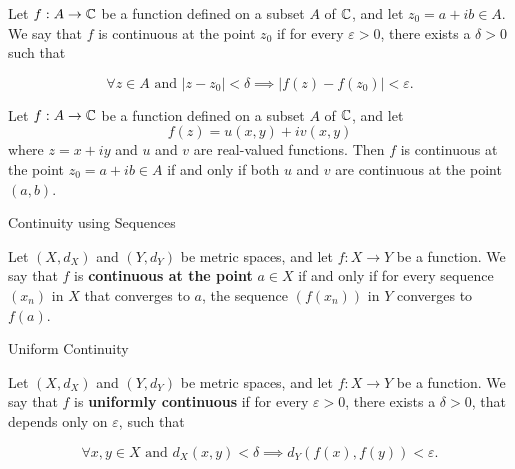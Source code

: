 \documentclass[12pt, a4paper]{article}
\begin{document}
\vspace{10pt}

\begin{definition}
    Let $f : A \to \mathbb{C}$ be a function defined on a subset $A$ of $\mathbb{C}$, and let $z_0 = a + ib \in A$. We say that $f$ is continuous at the point $z_0$ if for every $\varepsilon > 0$, there exists a $\delta > 0$ such that
    
    \[\forall z \in A \text{ and } |z - z_0| < \delta \implies |f(z) - f(z_0)| < \varepsilon.\]
\end{definition}

\vspace{50pt}

\begin{definition}
    Let $f : A \to \mathbb{C}$ be a function defined on a subset $A$ of $\mathbb{C}$, and let $$f(z) = u(x, y) + iv(x, y)$$ where $z = x + iy$ and $u$ and $v$ are real-valued functions. Then $f$ is continuous at the point $z_0 = a + ib \in A$ if and only if both $u$ and $v$ are continuous at the point $(a, b)$.
    
\end{definition}

\clearpage

\begin{heading}
    Continuity using Sequences
\end{heading}

\vspace{10pt}

\begin{theorem}
    Let $(X, d_X)$ and $(Y, d_Y)$ be metric spaces, and let $f : X \to Y$ be a function. We say that $f$ is \textbf{continuous at the point} $a \in X$ if and only if for every sequence $(x_n)$ in $X$ that converges to $a$, the sequence $(f(x_n))$ in $Y$ converges to $f(a)$.
\end{theorem}

\clearpage

\begin{heading}
    Uniform Continuity
\end{heading}

\vspace{10pt}

\begin{definition}
    Let $(X, d_X)$ and $(Y, d_Y)$ be metric spaces, and let $f : X \to Y$ be a function. We say that $f$ is \textbf{uniformly continuous} if for every $\varepsilon > 0$, there exists a $\delta > 0$, that depends only on $\varepsilon$, such that 
    
    \[\forall x, y \in X \text{ and } d_X(x, y) < \delta \implies d_Y(f(x), f(y)) < \varepsilon.\]
\end{definition}
\end{document}
